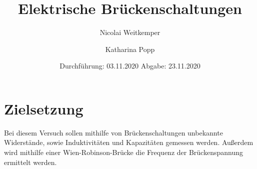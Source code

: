 

\subject{V302}
\title{Elektrische Brückenschaltungen}
\author{Nicolai Weitkemper \and Katharina Popp}
\date{
    Durchführung: 03.11.2020
    \hspace{3em}
    Abgabe: 23.11.2020 %
}



\maketitle
\thispagestyle{empty}
\tableofcontents
\newpage

\section{Zielsetzung} \label{sec:Ziel}

Bei diesem Versuch sollen mithilfe von Brückenschaltungen unbekannte Widerstände, sowie Induktivitäten und Kapazitäten gemessen werden.
Außerdem wird mithilfe einer Wien-Robinson-Brücke die Frequenz der Brückenspannung ermittelt werden.


\newpage


\newpage


\newpage


